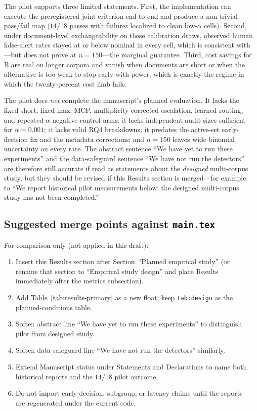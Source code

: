 \documentclass[pdflatex,sn-mathphys-num]{sn-jnl}
\begin{document}
The pilot supports three limited statements. First, the implementation can execute the preregistered joint criterion end to end and produce a non-trivial pass/fail map (\(14/18\) passes with failures localized to clean low-\(\alpha\) cells). Second, under document-level exchangeability on these calibration draws, observed human false-alert rates stayed at or below nominal in every cell, which is consistent with---but does not prove at \(n=150\)---the marginal guarantee. Third, cost savings for B are real on longer corpora and vanish when documents are short or when the alternative is too weak to stop early with power, which is exactly the regime in which the twenty-percent cost limb fails.

The pilot does \emph{not} complete the manuscript's planned evaluation. It lacks the fixed-short, fixed-max, MCP, multiplicity-corrected escalation, learned-routing, and repeated-\(\alpha\) negative-control arms; it lacks independent audit sizes sufficient for \(\alpha=0.001\); it lacks valid RQ4 breakdowns; it predates the active-set early-decision fix and the metadata corrections; and \(n=150\) leaves wide binomial uncertainty on every rate. The abstract sentence ``We have yet to run these experiments'' and the data-safeguard sentence ``We have not run the detectors'' are therefore still accurate if read as statements about the \emph{designed} multi-corpus study, but they should be revised if this Results section is merged---for example, to ``We report historical pilot measurements below; the designed multi-corpus study has not been completed.''

\subsection{Suggested merge points against \texttt{main.tex}}

For comparison only (not applied in this draft):
\begin{enumerate}
\item Insert this Results section after Section~``Planned empirical study'' (or rename that section to ``Empirical study design'' and place Results immediately after the metrics subsection).
\item Add Table~\ref{tab:results-primary} as a new float; keep \texttt{tab:design} as the planned-conditions table.
\item Soften abstract line ``We have yet to run these experiments'' to distinguish pilot from designed study.
\item Soften data-safeguard line ``We have not run the detectors'' similarly.
\item Extend Manuscript status under Statements and Declarations to name both historical reports and the \(14/18\) pilot outcome.
\item Do not import early-decision, subgroup, or latency claims until the reports are regenerated under the current code.
\end{enumerate}
\end{document}
